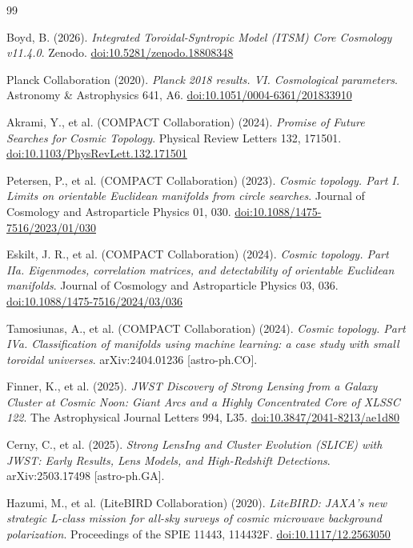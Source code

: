 \documentclass[aps,prd,11pt,onecolumn,superscriptaddress,nofootinbib,floatfix]{revtex4-2}
\begin{document}
\begin{thebibliography}{99}

Boyd, B. (2026). \textit{Integrated Toroidal-Syntropic Model (ITSM) Core Cosmology v11.4.0}. Zenodo. \href{https://doi.org/10.5281/zenodo.18808348}{doi:10.5281/zenodo.18808348}

Planck Collaboration (2020). \textit{Planck 2018 results. VI. Cosmological parameters}. Astronomy \& Astrophysics 641, A6. \href{https://doi.org/10.1051/0004-6361/201833910}{doi:10.1051/0004-6361/201833910}

Akrami, Y., et al. (COMPACT Collaboration) (2024). \textit{Promise of Future Searches for Cosmic Topology}. Physical Review Letters 132, 171501. \href{https://doi.org/10.1103/PhysRevLett.132.171501}{doi:10.1103/PhysRevLett.132.171501}

Petersen, P., et al. (COMPACT Collaboration) (2023). \textit{Cosmic topology. Part I. Limits on orientable Euclidean manifolds from circle searches}. Journal of Cosmology and Astroparticle Physics 01, 030. \href{https://doi.org/10.1088/1475-7516/2023/01/030}{doi:10.1088/1475-7516/2023/01/030}

Eskilt, J. R., et al. (COMPACT Collaboration) (2024). \textit{Cosmic topology. Part IIa. Eigenmodes, correlation matrices, and detectability of orientable Euclidean manifolds}. Journal of Cosmology and Astroparticle Physics 03, 036. \href{https://doi.org/10.1088/1475-7516/2024/03/036}{doi:10.1088/1475-7516/2024/03/036}

Tamosiunas, A., et al. (COMPACT Collaboration) (2024). \textit{Cosmic topology. Part IVa. Classification of manifolds using machine learning: a case study with small toroidal universes}. arXiv:2404.01236 [astro-ph.CO].

Finner, K., et al. (2025). \textit{JWST Discovery of Strong Lensing from a Galaxy Cluster at Cosmic Noon: Giant Arcs and a Highly Concentrated Core of XLSSC 122}. The Astrophysical Journal Letters 994, L35. \href{https://doi.org/10.3847/2041-8213/ae1d80}{doi:10.3847/2041-8213/ae1d80}

Cerny, C., et al. (2025). \textit{Strong LensIng and Cluster Evolution (SLICE) with JWST: Early Results, Lens Models, and High-Redshift Detections}. arXiv:2503.17498 [astro-ph.GA].

Hazumi, M., et al. (LiteBIRD Collaboration) (2020). \textit{LiteBIRD: JAXA's new strategic L-class mission for all-sky surveys of cosmic microwave background polarization}. Proceedings of the SPIE 11443, 114432F. \href{https://doi.org/10.1117/12.2563050}{doi:10.1117/12.2563050}


\end{thebibliography}
\end{document}
